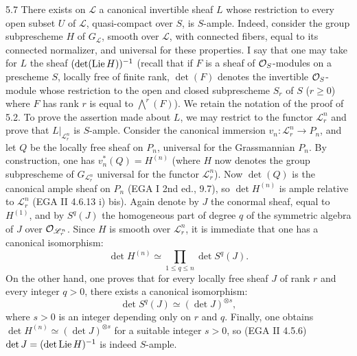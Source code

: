 \begin{remark}{5.7}\label{XV.5.7}
There exists on $\mathscr L$ a canonical invertible sheaf $L$ whose restriction to every open subset $U$ of $\mathscr L$, quasi-compact over $S$, is $S$-ample. Indeed, consider the group subprescheme $H$ of $G_{\mathscr L}$, smooth over $\mathscr L$, with connected fibers, equal to its connected normalizer, and universal for these properties. I say that one may take for $L$ the sheaf $(\det(\operatorname{Lie} H))^{-1}$ (recall that if $F$ is a sheaf of $\mathcal{O}_S$-modules on a prescheme $S$, locally free of finite rank, $\det(F)$ denotes the invertible $\mathcal{O}_S$-module whose restriction to the open and closed subprescheme $S_r$ of $S$ ($r\geq0$) where $F$ has rank $r$ is equal to $\bigwedge^r(F)$). We retain the notation of the proof of 5.2. To prove the assertion made about $L$, we may restrict to the functor $\mathscr L_r^n$ and prove that $L|_{\mathscr L_r^n}$ is $S$-ample. Consider the canonical immersion $v_n:\mathscr L_r^n\to P_n$, and let $Q$ be the locally free sheaf on $P_n$, universal for the Grassmannian $P_n$. By construction, one has $v_n^*(Q)=H^{(n)}$ (where $H$ now denotes the group subprescheme of $G_{\mathscr L_r^n}$ universal for the functor $\mathscr L_r^n$). Now $\det(Q)$ is the canonical ample sheaf on $P_n$ (EGA I 2nd ed., 9.7), so $\det H^{(n)}$ is ample relative to $\mathscr L_r^n$ (EGA II 4.6.13 i) bis). Again denote by $J$ the conormal sheaf, equal to $H^{(1)}$, and by $S^q(J)$ the homogeneous part of degree $q$ of the symmetric algebra of $J$ over $\mathcal{O}_{\mathscr L_r^n}$. Since $H$ is smooth over $\mathscr L_r^n$, it is immediate that one has a canonical isomorphism:
\[
\det H^{(n)}\simeq\prod_{1\leq q\leq n}\det S^q(J).
\]
On the other hand, one proves that for every locally free sheaf $J$ of rank $r$ and every integer $q>0$, there exists a canonical isomorphism:
\[
\det S^q(J)\simeq(\det J)^{\otimes s},
\]
where $s>0$ is an integer depending only on $r$ and $q$. Finally, one obtains $\det H^{(n)}\simeq(\det J)^{\otimes s}$ for a suitable integer $s>0$, so (EGA II 4.5.6) $\det J=(\det\operatorname{Lie} H)^{-1}$ is indeed $S$-ample.
\end{remark}

